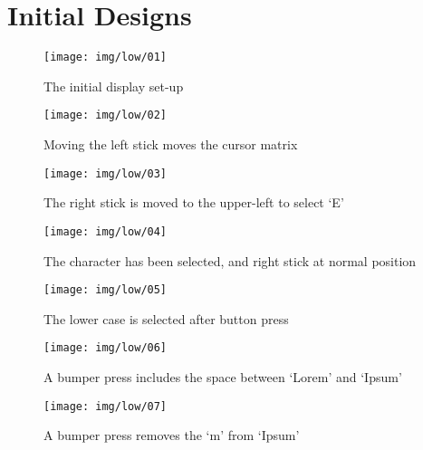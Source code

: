 \documentclass[requirements.tex]{subfiles}
\begin{document}
\section{Initial Designs} %
\label{sec:initial_designs}

\begin{figure}[H]
    \centering
    \texttt{[image: img/low/01]}
    \caption{The initial display set-up}
    \label{fig:initial}
\end{figure}

\begin{figure}[H]
    \centering
    \texttt{[image: img/low/02]}
    \caption{Moving the left stick moves the cursor matrix}
    \label{fig:matrix}
\end{figure}

\begin{figure}[H]
    \centering
    \texttt{[image: img/low/03]}
    \caption{The right stick is moved to the upper-left to select `E'}
    \label{fig:select}
\end{figure}

\begin{figure}[H]
    \centering
    \texttt{[image: img/low/04]}
    \caption{The character has been selected, and right stick at normal
    position}
    \label{fig:selected}
\end{figure}

\begin{figure}[H]
    \centering
    \texttt{[image: img/low/05]}
    \caption{The lower case is selected after button press}
    \label{fig:case}
\end{figure}

\begin{figure}[H]
    \centering
    \texttt{[image: img/low/06]}
    \caption{A bumper press includes the space between `Lorem' and `Ipsum'}
    \label{fig:space}
\end{figure}

\begin{figure}[H]
    \centering
    \texttt{[image: img/low/07]}
    \caption{A bumper press removes the `m' from `Ipsum'}
    \label{fig:backspace}
\end{figure}
\newpage
\end{document}
